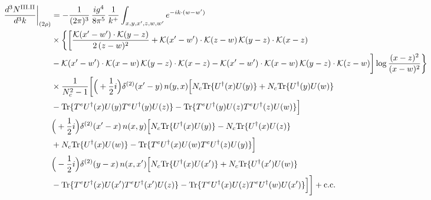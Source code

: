 \documentclass[9pt]{article}
\numberwithin{equation}{section}
\begin{document}
\begin{align}
\frac{d^{3}N^{\rm III.II}}{d^{3}k}\bigg|_{(2\rho)}&=-\frac{1}{(2\pi)^{3}}\,\frac{ig^{4}}{8\pi^{5}}\,\frac{1}{k^{+}}\int_{x,y,x',z,w,w'}e^{-ik\cdot(w-w')}\notag\\
&\times\bigg\{\bigg[\frac{\mathcal{K}(x'-w')\cdot\mathcal{K}(y-z)}{2\,(z-w)^{2}}+\mathcal{K}(x'-w')\cdot\mathcal{K}(z-w)\,\mathcal{K}(y-z)\cdot\mathcal{K}(x-z)\notag\\
&-\mathcal{K}(x'-w')\cdot\mathcal{K}(x-w)\,\mathcal{K}(y-z)\cdot\mathcal{K}(x-z)-\mathcal{K}(x'-w')\cdot\mathcal{K}(x-w)\,\mathcal{K}(y-z)\cdot\mathcal{K}(z-w)\bigg]\log\frac{(x-z)^{2}}{(x-w)^{2}}\bigg\}\notag\\
&\times \frac{1}{N_{c}^{2}-1}\bigg[\Big(+\frac{1}{2}i\Big)\delta^{(2)}(x'-y)\,n(y,x)\Big[N_{c}{\rm Tr}\{U^{\dagger}(x)U(y)\}+N_{c}{\rm Tr}\{U^{\dagger}(y)U(w)\}\notag\\
& -{\rm Tr}\{T^{e}U^{\dagger}(x)U(y)T^{e}U^{\dagger}(y)U(z)\}-{\rm Tr}\{T^{e}U^{\dagger}(y)U(z)T^{e}U^{\dagger}(z)U(w)\}\Big]\notag\\
& \Big(+\frac{1}{2}i\Big)\delta^{(2)}(x'-x)\,n(x,y)\Big[N_{c}{\rm Tr}\{U^{\dagger}(x)U(y)\}-N_{c}{\rm Tr}\{U^{\dagger}(x)U(z)\}\notag\\
& +N_{c}{\rm Tr}\{U^{\dagger}(x)U(w)\}-{\rm Tr}\{T^{e}U^{\dagger}(x)U(w)T^{e}U^{\dagger}(z)U(y)\}\Big]\notag\\
& \Big(-\frac{1}{2}i\Big)\delta^{(2)}(y-x)\,n(x,x')\Big[N_{c}{\rm Tr}\{U^{\dagger}(x)U(x')\}+N_{c}{\rm Tr}\{U^{\dagger}(x')U(w)\}\notag\\
& -{\rm Tr}\{T^{e}U^{\dagger}(x)U(x')T^{e}U^{\dagger}(x')U(z)\}-{\rm Tr}\{T^{e}U^{\dagger}(x)U(z)T^{e}U^{\dagger}(w)U(x')\}\Big]\bigg]+{\rm c.c.}\label{eq:E-III.II-2}
\end{align}
\end{document}
